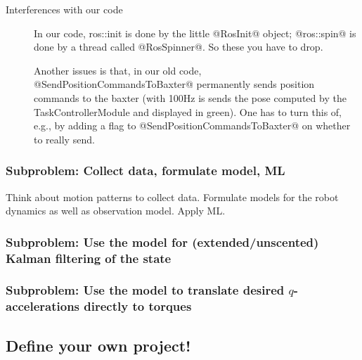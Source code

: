 \documentclass[10pt,fleqn,twoside]{article}
\newenvironment{code}{\footnotesize}{}
\begin{document}
\begin{description}
\begin{code}
\begin{Verbatim}
\end{Verbatim}
\end{code}

\item[Interferences with our code] In our code, ros::init is done by the little
  @RosInit@ object; @ros::spin@ is done by a thread called
  @RosSpinner@. So these you have to drop.

  Another issues is that, in our old code,
  @SendPositionCommandsToBaxter@ permanently sends position commands
  to the baxter (with 100Hz is sends the pose computed
  by the TaskControllerModule and displayed in green). One has to
  turn this of, e.g., by adding a flag to
  @SendPositionCommandsToBaxter@ on whether to really send.
\end{description}



\subsubsection{Subproblem: Collect data, formulate model, ML}

Think about motion patterns to collect data. Formulate models for the
robot dynamics as well as observation model. Apply ML.

\subsubsection{Subproblem: Use the model for (extended/unscented)
  Kalman filtering of the state}


\subsubsection{Subproblem: Use the model to translate desired
  $q$-accelerations directly to torques}



\subsection{Define your own project!}
\end{document}
